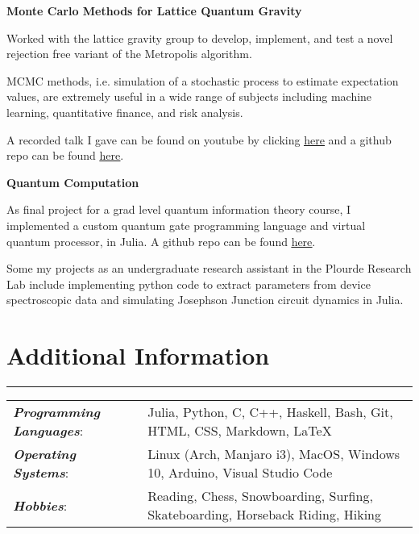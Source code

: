 \documentclass[9pt]{extarticle}
\newcommand{\myline}{\rule[\baselineskip]{\linewidth}{1pt}}
\begin{document}
\vspace{2.5pt}
\large\textbf{Monte Carlo Methods for Lattice Quantum Gravity}
\normalsize

\begin{compactitem}
\item Worked with the lattice gravity group to develop, implement, and test a novel rejection free variant of the Metropolis algorithm.
\item MCMC methods, i.e. simulation of a stochastic process to estimate expectation values, are extremely useful in a wide range of subjects including machine learning, quantitative finance, and risk analysis.
\item A recorded talk I gave can be found on youtube by clicking \href{https://www.youtube.com/watch?v=_Ppx0e3aG-E&t=2s}{\underline{here}} and a github repo can be found \href{https://github.com/aarontrowbridge/Ising}{\underline{here}}.
\end{compactitem}

\vspace{2.5pt}
\large\textbf{Quantum Computation}
\normalsize

\begin{compactitem}
\item As final project for a grad level quantum information theory course, I implemented a custom quantum gate programming language and virtual quantum processor, in Julia. A github repo can be found \href{https://github.com/aarontrowbridge/QuIPS}{\underline{here}}.
\item Some my projects as an undergraduate research assistant in the Plourde Research Lab include implementing python code to extract parameters from device spectroscopic data and simulating Josephson Junction circuit dynamics in Julia.  
\end{compactitem}

\section{Additional Information}
\myline

\normalsize

\begin{tabular}{ll}
\textbf{\textit{Programming Languages}}: & Julia, Python, C, C++,  Haskell, Bash, Git, HTML, CSS, Markdown, \LaTeX \\
\textbf{\textit{Operating Systems}}: & Linux (Arch, Manjaro i3), MacOS, Windows 10, Arduino, Visual Studio Code \\ 
\textbf{\textit{Hobbies}}: & Reading, Chess, Snowboarding, Surfing, Skateboarding, Horseback Riding, Hiking \\    
\end{tabular}
\end{document}

